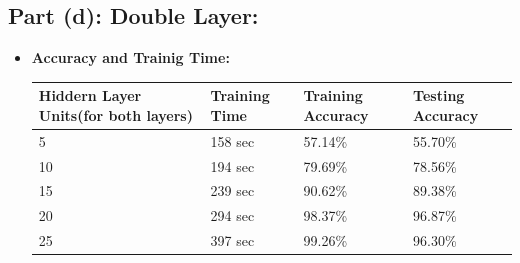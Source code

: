 \documentclass[a4 paper]{article}
\begin{document}
\subsection*{Part (d): Double Layer:}
\begin{itemize}
\item \textbf{Accuracy and Trainig Time:}

\hskip1.0cm\begin{tabular}{ |p{2.7cm}||p{2.5cm}|p{3.3cm}|p{3.3cm}|}
	 \hline
	 \hline \textbf{Hiddern Layer Units(for both layers)} & \textbf{Training Time} & \textbf{Training Accuracy} & \textbf{Testing Accuracy}\\
	 \hline
	 5 &  158 sec & 57.14\% &  55.70\% \\
	 10 & 194 sec & 79.69\% &  78.56\% \\
	 15 & 239 sec & 90.62\% &  89.38\% \\
	 20 & 294 sec & 98.37\% &  96.87\% \\
	 25 & 397 sec & 99.26\% &  96.30\% \\
	 \hline
\end{tabular}

\begin{figure}[H]
\centering
	\begin{floatrow}
	\hspace*{-0.9in}
\end{floatrow}
\end{figure}



\end{itemize}
\end{document}
